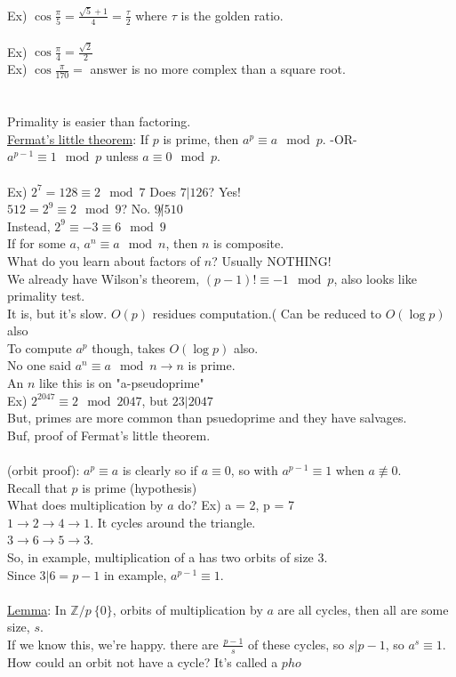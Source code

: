 \documentclass[13pt]{article}
\begin{document}
		Ex) $\cos \frac{\pi}{5} = \frac{\sqrt{5} + 1}{4} = \frac{\tau}{2}$
		where $\tau$ is the golden ratio.\\\\
		Ex) $\cos \frac{\pi}{4} = \frac{\sqrt{2}}{2}$\\
		Ex) $\cos \frac{\pi}{170} = $ answer is no more complex than a square
		root.\\\\\\
		Primality is easier than factoring.\\
		\underline{Fermat's little theorem}: If $p$ is prime, then $a^p \equiv
		a \mod p$. -OR- $a^{p-1} \equiv 1 \mod p$ unless $a \equiv 0 \mod p$.\\\\
		Ex) $2^7 = 128 \equiv 2 \mod 7$ Does $7 | 126$? Yes!\\
		$ 512 = 2^9 \equiv 2 \mod 9$? No. $9 \not| 510$\\
		Instead, $2^9 \equiv -3 \equiv 6 \mod 9$\\
		If for some $a$, $a^n \equiv a \mod n$, then $n$ is composite.\\
		What do you learn about factors of $n$? Usually NOTHING!\\
		We already have Wilson's theorem, $(p-1)! \equiv -1 \mod p$, also looks
		like primality test.\\
		It is, but it's slow. $O(p)$ residues computation.( Can be reduced
		to $O(\log p)$ also\\
		To compute $a^p$ though, takes $O(\log p)$ also.\\
		No one said $a^n \equiv a \mod n \rightarrow n$ is prime.\\
		An $n$ like this is on "a-pseudoprime"\\
		Ex) $2^{2047} \equiv 2 \mod 2047$, but $23 | 2047$\\
		But, primes are more common than psuedoprime and they have salvages.\\
		Buf, proof of Fermat's little theorem.\\\\
		(orbit proof): $a^p \equiv a$ is clearly so if $a \equiv 0$,
		so with $a^{p-1} \equiv 1$ when $a \not\equiv 0$.\\
		Recall that $p$ is prime (hypothesis)\\
		What does multiplication by $a$ do?
		Ex) a = 2, p = 7\\
		$1 \to 2 \to 4 \to 1$. It cycles around the triangle.\\
		$3 \to 6 \to 5 \to 3$.\\
		So, in example, multiplication of a has two orbits of size 3.\\
		Since $3|6 = p - 1$ in example, $a^{p-1} \equiv 1$.\\\\
		\underline{Lemma}: In $\mathbb{Z} / p \ \{0\}$, orbits of multiplication
		by $a$ are all cycles, then all are some size, $s$.\\
		If we know this, we're happy. there are $\frac{p-1}{s}$ of these cycles,
		so $s| p -1$, so $a^s \equiv 1$.\\
		How could an orbit not have a cycle? It's called a $pho$
\end{document}
